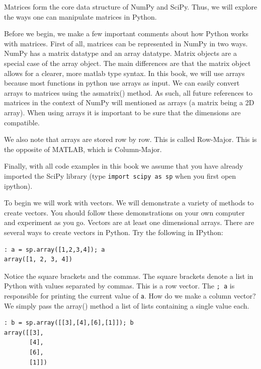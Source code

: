 

Matrices form the core data structure of NumPy and SciPy.  Thus, we will explore
the ways one can manipulate matrices in Python.

Before we begin, we make a few important comments about how Python works with matrices. First of all, matrices can be represented in NumPy in two ways.  NumPy has a matrix
datatype and an array datatype.  Matrix objects are a special case of the array
object.  The main differences are that the matrix object allows for a clearer,
more matlab type syntax.  In this book, we will use arrays because most functions in python use arrays as input. We can easily convert arrays to matrices using the asmatrix()
method.  As such, all future references to matrices in the context of NumPy will
mentioned as arrays (a matrix being a 2D array).  When using arrays it is important to be sure that the dimensions are compatible.

We also note that arrays are stored row by row. This is called Row-Major. This is the opposite of MATLAB, which is Column-Major.

Finally, with all code examples in this book we assume that you have already imported the SciPy library (type \texttt{import scipy as sp} when you first open ipython).

To begin we will work with vectors. We will demonstrate a variety of methods to
create vectors. You should follow these demonstrations on your own computer and
experiment as you go.  Vectors are at least one dimensional arrays.  There are
several ways to create vectors in Python.  Try the following in IPython:

\begin{lstlisting}
: a = sp.array([1,2,3,4]); a
array([1, 2, 3, 4])
\end{lstlisting}

Notice the square brackets and the commas.  The square brackets denote a list in
Python with values separated by commas.  This is a row vector.  The \texttt{; a}
is responsible for printing the current value of \texttt{a}.  How do we make a
column vector?  We simply pass the array() method a list of lists containing a
single value each.
\begin{lstlisting}
: b = sp.array([[3],[4],[6],[1]]); b
array([[3],
       [4],
       [6],
       [1]])
\end{lstlisting}

